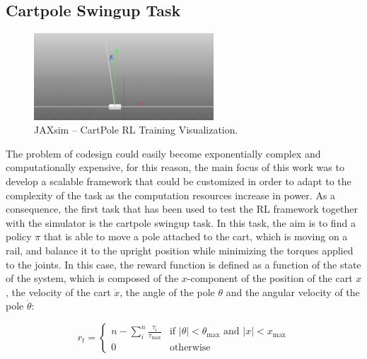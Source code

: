 
\subsection{Cartpole Swingup Task}

\begin{figure}
    \centering
    \caption{JAXsim -- CartPole RL Training Visualization.}
    \label{fig:cartpole}
    \includegraphics[width=0.6\textwidth]{Images/cartpole.png}
\end{figure}

The problem of codesign could easily become exponentially complex and computationally expensive, for this reason, the main focus of this work was to develop a scalable framework that could be customized in order to adapt to the complexity of the task as the computation resources increase in power. As a consequence, the first task that has been used to test the \ac{RL} framework together with the \jaxsim simulator is the cartpole swingup task. In this task, the aim is to find a policy $\pi$ that is able to move a pole attached to the cart, which is moving on a rail, and balance it to the upright position while minimizing the torques applied to the joints. In this case, the reward function is defined as a function of the state of the system, which is composed of the $x$-component of the position of the cart $x$, the velocity of the cart $\dot{x}$, the angle of the pole $\theta$ and the angular velocity of the pole $\dot{\theta}$:

\begin{equation}
    r _t = \begin{cases}
        n - \sum _i ^n \frac{\tau _i}{\tau _{\text{max}}} & \text{if } \left| \theta \right| < \theta_{\text{max}} \text{ and } \left| x \right| < x_{\text{max}} \\
        0                                                 & \text{otherwise}
    \end{cases}
\end{equation}


